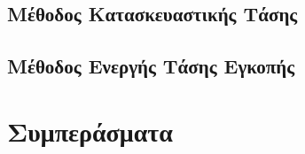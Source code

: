 \documentclass{article}
\begin{document}
\subsection{Μέθοδος Κατασκευαστικής Τάσης}

\subsection{Μέθοδος Ενεργής Τάσης Εγκοπής}


\section{Συμπεράσματα}

\listoffigures
\listoftables
\end{document}
